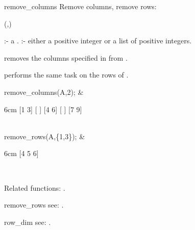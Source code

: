 \begin{Operator}{remove_columns}
Remove columns, remove rows:

\begin{Syntax}
(,)
\end{Syntax}

       :- a .
 :- either a positive integer or a list of positive 
                       integers.

 removes the columns specified in 
 from . 

 performs the same task on the rows of .

\begin{Examples} 

remove_columns(A,2); &
\begin{multilineoutput}{6cm}
[1  3]
[    ]
[4  6]
[    ]
[7  9]
\end{multilineoutput}\\

remove_rows(A,\{1,3\}); &
\begin{multilineoutput}{6cm}
[4  5  6]
\end{multilineoutput}\\


\end{Examples}

Related functions: .

\end{Operator}


\begin{Operator}{remove_rows}
see:  .
\end{Operator}


\begin{Operator}{row_dim}
see:  .
\end{Operator}


